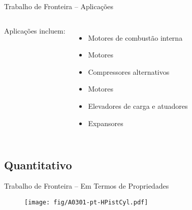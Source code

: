     \begin{frame}{Trabalho de Fronteira -- Aplicações}\vspace*{-2em}
        \begin{columns}
        Aplicações incluem:                                             \\[\medskipamount]
        \begin{itemize}
            \item Motores de combustão interna                          \\[\medskipamount]
            \item Motores \bf{}\rm      \\[\medskipamount]
            \item Compressores alternativos                             \\[\medskipamount]
            \item Motores \bf{}\rm      \\[\medskipamount]
            \item Elevadores de carga e atuadores                       \\[\medskipamount]
            \item Expansores \bf{}\rm
        \end{itemize}
        \end{columns}
    \end{frame}

\subsection{Quantitativo}

    \begin{frame}{Trabalho de Fronteira -- Em Termos de Propriedades}\vspace*{-2em}
        \begin{figure}
            \texttt{[image: fig/A0301-pt-HPistCyl.pdf]}
        \end{figure}
    \end{frame}

